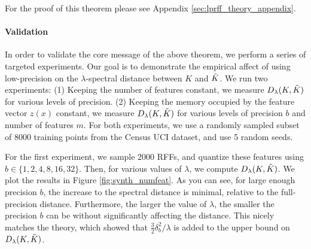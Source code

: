 


For the proof of this theorem please see Appendix \ref{sec:lprff_theory_appendix}.\\

\paragraph{Validation} In order to validate the core message of the above theorem, we perform a series of targeted experiments. Our goal is to demonstrate the empirical affect of using low-precision on the $\lambda$-spectral distance between $K$ and $\tilde{K}$. We run two experiments: (1) Keeping the number of features constant, we measure $D_{\lambda}(K,\tilde{K})$ for various levels of precision. (2) Keeping the memory occupied by the feature vector $z(x)$ constant, we measure $D_{\lambda}(K,\tilde{K})$ for various levels of precision $b$ and number of features $m$.  For both experiments, we use a randomly sampled subset of $8000$ training points from the Census UCI dataset, and use 5 random seeds.

For the first experiment, we sample 2000 RFFs, and quantize these features using $b \in \{1,2,4,8,16,32\}$.  Then, for various values of $\lambda$, we compute $D_{\lambda}(K,\tilde{K})$.  We plot the results in Figure \ref{fig:synth_numfeat}. As you can see, for large enough precision $b$, the increase to the spectral distance is minimal, relative to the full-precision distance. Furthermore, the larger the value of $\lambda$, the smaller the precision $b$ can be without significantly affecting the distance. This nicely matches the theory, which showed that $\frac{3}{2}\delta_b^2/\lambda$ is added to the upper bound on $D_{\lambda}(K,\tilde{K})$.

